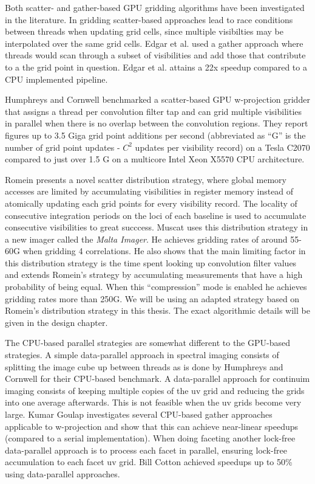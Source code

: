 Both scatter- and gather-based GPU gridding algorithms have been investigated in the literature. In gridding scatter-based approaches lead to race conditions between
threads when updating grid cells, since multiple visibilties may be interpolated over the same grid cells. Edgar et al. \cite{edgar2010enabling} used a gather approach where 
threads would scan through a subset of visibilities and add those that contribute to a the grid point in question. Edgar et al. attains a 22x speedup compared to a CPU implemented pipeline.  

Humphreys and Cornwell \cite{humphreys2011analysis} benchmarked a scatter-based GPU w-projection gridder that assigns a thread per convolution filter tap and can grid multiple visibilities in parallel when there is no overlap
between the convolution regions. They report figures up to 3.5 Giga grid point additions per second (abbreviated as ``G'' is the number of grid point updates - $C^2$ updates per visibility record) on a Tesla C2070 compared to 
just over 1.5 G on a multicore Intel Xeon X5570 CPU architecture. 

Romein \cite{romein2012efficient} presents a novel scatter distribution strategy, where global memory accesses are limited by accumulating visibilities in register memory instead of atomically updating
each grid points for every visibility record. The locality of consecutive integration periods on the loci of each baseline is used to accumulate consecutive visibilities to great succcess. 
Muscat \cite{muscat2014high} uses this distribution strategy in a new imager called the \textit{Malta Imager}. He achieves gridding rates of around 55-60G when gridding 4 correlations. He also
shows that the main limiting factor in this distribution strategy is the time spent looking up convolution filter values and extends Romein's strategy by accumulating measurements that have a high probability
of being equal. When this ``compression'' mode is enabled he achieves gridding rates more than 250G. We will be using an adapted strategy based on Romein's distribution strategy in this thesis. The exact algorithmic details will be given in the design chapter.

The CPU-based parallel strategies are somewhat different to the GPU-based strategies. A simple data-parallel approach in spectral imaging consists of splitting the image cube up between threads as is done by Humphreys and Cornwell \cite{humphreys2011analysis} for
their CPU-based benchmark. A data-parallel approach for continuim imaging consists of keeping multiple copies of the uv grid and reducing the grids into one average
afterwards. This is not feasible when the uv grids become very large. Kumar Goulap \cite{golap2015mutithreading} investigates several CPU-based gather approaches applicable to w-projection and show that
this can achieve near-linear speedups (compared to a serial implementation). When doing faceting another lock-free data-parallel approach is to process each facet in parallel, ensuring lock-free accumulation
to each facet uv grid. Bill Cotton \cite{obitfaceting} achieved speedups up to 50\% using data-parallel approaches.